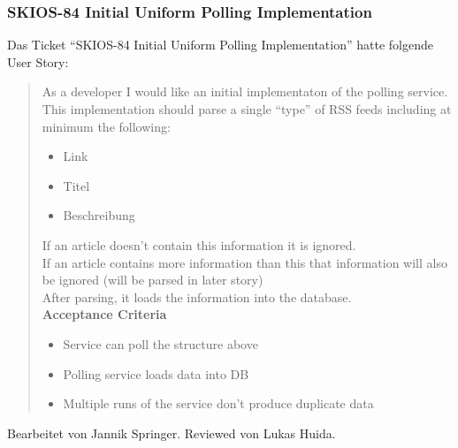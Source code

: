 \subsubsection{SKIOS-84 Initial Uniform Polling Implementation}
Das Ticket \enquote{SKIOS-84 Initial Uniform Polling Implementation} hatte folgende User Story:
\begin{quotation}
    As a developer I would like an initial implementaton of the polling service.\\
    This implementation should parse a single \enquote{type} of RSS feeds including at minimum the following:
    
    \begin{itemize}
        \item Link
        \item Titel
        \item Beschreibung
    \end{itemize}

    If an article doesn't contain this information it is ignored.\\
    If an article contains more information than this that information will also be ignored (will be parsed in later story)\\
    After parsing, it loads the information into the database. \\
\textbf{Acceptance Criteria}
\begin{itemize}
    \item Service can poll the structure above
    \item Polling service loads data into DB
    \item Multiple runs of the service don't produce duplicate data
\end{itemize}
\end{quotation}
Bearbeitet von Jannik Springer.
Reviewed von Lukas Huida.

